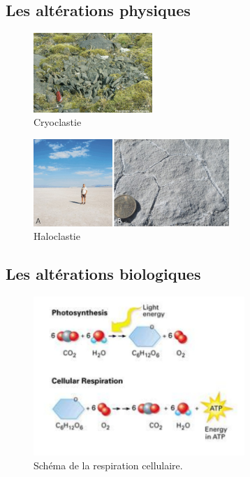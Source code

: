 \documentclass{beamer}
\begin{document}
\subsection{Les altérations physiques}
\begin{frame}
  \begin{center}
    \begin{figure}
      \includegraphics[width=4.5cm]{Images/Diapos/Alteration/Physique/cryoclastie.jpg}
      \caption{Cryoclastie}
    \end{figure}
  \end{center}
  \begin{center}
    \begin{figure}
      \includegraphics[width=7.4cm]{Images/Diapos/Alteration/Physique/haloclastie3.jpg}
      \caption{Haloclastie}
    \end{figure}
  \end{center}
\end{frame}

\subsection{Les altérations biologiques}
\begin{frame}
  \begin{center}
    \begin{figure}
      \includegraphics[width=8cm]{Images/Diapos/Alteration/Biologique/biology-unit-3-cell-energy-cellular-respiration-notes-3-638.jpg}
      \caption{Schéma de la respiration cellulaire.}
    \end{figure}
  \end{center}
\end{frame}
\end{document}
